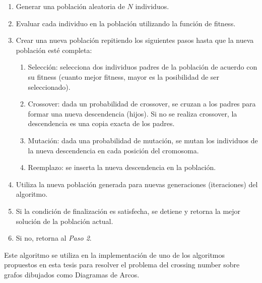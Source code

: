 \begin{enumerate}[{Paso} 1]
    \item  Generar una población aleatoria de $N$ individuos. 
     \item Evaluar cada individuo en la población utilizando la función de fitness. 
     \item Crear una nueva población repitiendo los siguientes pasos hasta que la nueva población esté completa:
\begin{enumerate}[{Paso 3.}1]
\item  Selección: selecciona dos individuos padres de la población de acuerdo con su fitness (cuanto mejor fitness, mayor es la posibilidad de ser seleccionado). 
\item  Crossover: dada un probabilidad de crossover, se cruzan a los padres para formar una nueva descendencia (hijos). Si no se realiza crossover, la descendencia es una copia exacta de los padres. 
\item  Mutación: dada una probabilidad de mutación, se mutan los individuos de la nueva descendencia en cada posición del cromosoma. 
\item  Reemplazo: se inserta la nueva descendencia en la población. \\
\end{enumerate}
\item  Utiliza la nueva población generada para nuevas generaciones (iteraciones) del algoritmo. 
\item  Si la condición de finalización es satisfecha, se detiene y retorna la mejor solución de la población actual. 
\item  Si no, retorna al \emph{Paso 2}. 

\end{enumerate}

Este algoritmo  se utiliza en la implementación de uno de los algoritmos propuestos en esta tesis para resolver el  problema del crossing number sobre grafos dibujados como Diagramas de Arcos.
 
